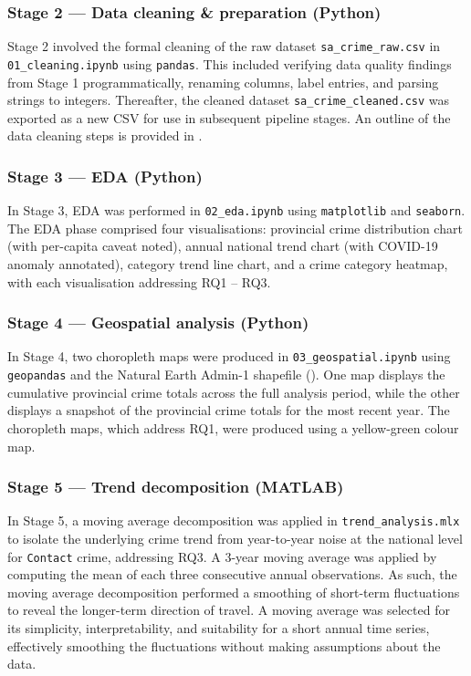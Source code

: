 \documentclass[titlepage, 12pt, oneside]{article}
\numberwithin{equation}{section}
\begin{document}
	\subsubsection*{Stage 2 --- Data cleaning \& preparation (Python)} \label{stage2}
	Stage 2 involved the formal cleaning of the raw dataset \texttt{sa{\_}crime{\_}raw.csv} in \texttt{01{\_}cleaning.ipynb} using \texttt{pandas}. This included verifying data quality findings from Stage 1 programmatically, renaming columns, label entries, and parsing strings to integers. Thereafter, the cleaned dataset \texttt{sa{\_}crime{\_}cleaned.csv} was exported as a new CSV for use in subsequent pipeline stages. An outline of the data cleaning steps is provided in . 
	
	\subsubsection*{Stage 3 --- EDA (Python)} \label{stage3}
	In Stage 3, EDA was performed in \texttt{02{\_}eda.ipynb} using \texttt{matplotlib} and \texttt{seaborn}. The EDA phase comprised four visualisations: provincial crime distribution chart (with per-capita caveat noted), annual national trend chart (with COVID-19 anomaly annotated), category trend line chart, and a crime category heatmap, with each visualisation addressing RQ1 -- RQ3.
		
    \subsubsection*{Stage 4 --- Geospatial analysis (Python)} \label{stage4}
    In Stage 4, two choropleth maps were produced in \texttt{03{\_}geospatial.ipynb} using \texttt{geopandas} and the Natural Earth Admin-1 shapefile (\cite{naturalearth}). One map displays the cumulative provincial crime totals across the full analysis period, while the other displays a snapshot of the provincial crime totals for the most recent year. The choropleth maps, which address RQ1, were produced using a yellow-green colour map. 
    
    \subsubsection*{Stage 5 --- Trend decomposition (MATLAB)} \label{stage5}
    In Stage 5, a moving average decomposition was applied in \texttt{trend{\_}analysis.mlx} to isolate the underlying crime trend from year-to-year noise at the national level for \texttt{Contact} crime, addressing RQ3. A 3-year moving average was applied by computing the mean of each three consecutive annual observations. As such, the moving average decomposition performed a smoothing of short-term fluctuations to reveal the longer-term direction of travel. A moving average was selected for its simplicity, interpretability, and suitability for a short annual time series, effectively smoothing the fluctuations without making assumptions about the data.
    
\end{document}
